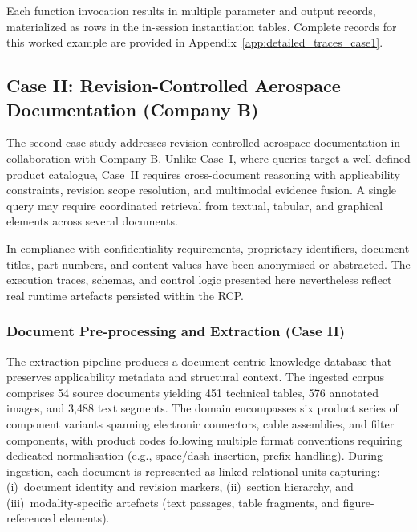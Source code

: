 \documentclass[largeformat]{interact}
\begin{document}
Each function invocation results in multiple parameter and output records, materialized as rows in the in-session instantiation tables. Complete records for this worked example are provided in Appendix~\ref{app:detailed_traces_case1}.


\subsection{Case II: Revision-Controlled Aerospace Documentation (Company B)}
\label{subsec:caseII_case}
The second case study addresses revision-controlled aerospace documentation in collaboration with Company B. Unlike Case~I, where queries target a well-defined product catalogue, Case~II requires cross-document reasoning with applicability constraints, revision scope resolution, and multimodal evidence fusion. A single query may require coordinated retrieval from textual, tabular, and graphical elements across several documents.

In compliance with confidentiality requirements, proprietary identifiers, document titles, part numbers, and content values have been anonymised or abstracted. The execution traces, schemas, and control logic presented here nevertheless reflect real runtime artefacts persisted within the RCP.

\subsubsection{Document Pre-processing and Extraction (Case II)}
\label{subsubsec:caseII_document_harvesting}
The extraction pipeline produces a document-centric knowledge database that preserves applicability metadata and structural context. The ingested corpus comprises 54 source documents yielding 451 technical tables, 576 annotated images, and 3{,}488 text segments. The domain encompasses six product series of component variants spanning electronic connectors, cable assemblies, and filter components, with product codes following multiple format conventions requiring dedicated normalisation (e.g., space/dash insertion, prefix handling). During ingestion, each document is represented as linked relational units capturing: (i)~document identity and revision markers, (ii)~section hierarchy, and (iii)~modality-specific artefacts (text passages, table fragments, and figure-referenced elements).
\end{document}

